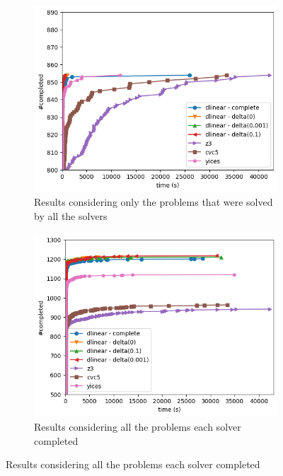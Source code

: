 \documentclass[runningheads]{llncs}
\begin{document}
\begin{figure}[H]
    \centering
    \begin{subfigure}{.45\textwidth}
        \centering
        \includegraphics[width=\linewidth]{img/on_file.png}
        \caption{Results considering only the problems that were solved by all the solvers}
        \label{fig:results1}
    \end{subfigure}%
    \hspace{1cm}
    \begin{subfigure}{.45\textwidth}
        \centering
        \includegraphics[width=\linewidth]{img/total.png}
        \caption{Results considering all the problems each solver completed}
        \label{fig:results2}
    \end{subfigure}
\end{figure}
\end{document}
